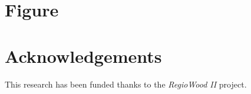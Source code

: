 \documentclass[3p,times]{elsarticle}
\begin{document}
\section{Figure}


	


\section{Acknowledgements}

This research has been funded thanks to the \textit{RegioWood II} project.



\end{document}
